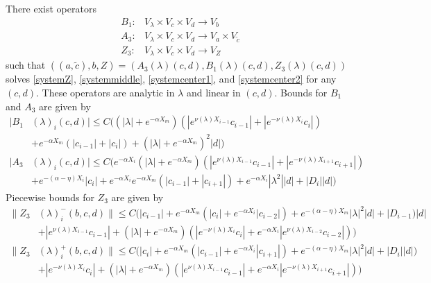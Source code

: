 \documentclass[thesis.tex]{subfiles}
\begin{document}
\begin{lemma}\label{Zinv2}
There exist operators
\begin{align*}
B_1: &V_\lambda \times V_c \times V_d \rightarrow V_b \\
A_3: &V_\lambda \times V_c \times V_d \rightarrow V_a \times V_{\tilde{c}} \\
Z_3: &V_\lambda \times V_c \times V_d \rightarrow V_Z
\end{align*}
such that $( (a, \tilde{c}) , b, Z ) = ( A_3(\lambda)(c, d), B_1(\lambda)(c, d), Z_3(\lambda)(c, d) )$ solves \eqref{systemZ}, \eqref{systemmiddle}, \eqref{systemcenter1}, and \eqref{systemcenter2} for any $(c, d)$. These operators are analytic in $\lambda$ and linear in $(c, d)$. Bounds for $B_1$ and $A_3$ are given by
\begin{align}
|B_1&(\lambda)_i(c, d)| \leq C \Big( (|\lambda| + e^{-\alpha X_m})(|e^{\nu(\lambda)X_{i-1}} c_{i-1}| + |e^{-\nu(\lambda)X_i} c_i|) \nonumber \\
&+ e^{-\alpha X_m}(|c_{i-1}| + |c_i|) + (|\lambda| + e^{-\alpha X_m})^2 |d|  \Big)\label{B1bound} \\
|A_3&(\lambda)_i(c, d)|
\leq C \Big(  
e^{-\alpha X_i} (|\lambda| + e^{-\alpha X_m})(|e^{\nu(\lambda)X_{i-1}} c_{i-1}| + |e^{-\nu(\lambda)X_{i+1}}c_{i+1}|) \nonumber \\
&+ e^{-(\alpha - \eta)X_i}|c_i| + e^{-\alpha X_i} e^{-\alpha X_m}(|c_{i-1}| + |c_{i+1}|) + e^{-\alpha X_i} |\lambda^2||d| + |D_i||d| \Big) \label{A3bound}
\end{align} 
Piecewise bounds for $Z_3$ are given by
\begin{equation}\label{Z3bound}
\begin{aligned}
\| Z_3&(\lambda)_i^-(b,c,d) \| \leq C\Big(|c_{i-1}| + e^{-\alpha X_m}(|c_i| + e^{-\alpha X_i} |c_{i-2}|) + e^{-(\alpha - \eta) X_m}|\lambda|^2|d| + |D_{i-1})|d| \\
&+ |e^{\nu(\lambda)X_{i-1}}c_{i-1}| + (|\lambda| + e^{-\alpha X_m})(|e^{-\nu(\lambda)X_i} c_i| + e^{-\alpha X_i} |e^{\nu(\lambda)X_{i-2}} c_{i-2}|)\Big) \\
\| Z_3&(\lambda)_i^+(b,c,d) \| \leq C\Big(|c_i| + e^{-\alpha X_m}(|c_{i-1}| + e^{-\alpha X_i} |c_{i+1}|) + e^{-(\alpha - \eta) X_m}|\lambda|^2|d| + |D_i||d|) \\
&+ |e^{-\nu(\lambda)X_i} c_i| + (|\lambda| + e^{-\alpha X_m})(|e^{\nu(\lambda)X_{i-1}} c_{i-1}| + e^{-\alpha X_i} |e^{-\nu(\lambda)X_{i+1}} c_{i+1}|)\Big)
\end{aligned}
\end{equation}

\end{lemma}
\end{document}
